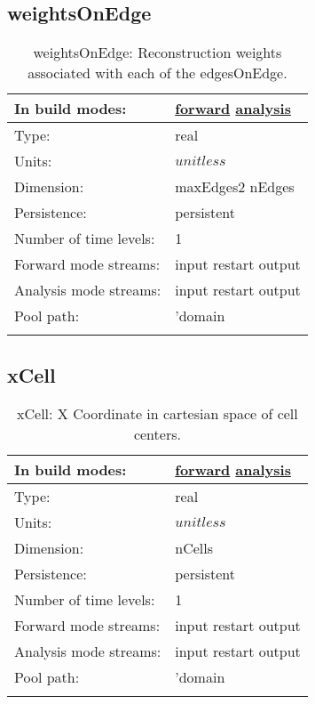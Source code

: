 \subsection[weightsOnEdge]{weightsOnEdge}
\label{subsec:var_sec_mesh_weightsOnEdge}
\begin{center}
\begin{longtable}{| p{2.0in} | p{4.0in} |}
        \hline 
        In build modes: & \hyperref[subsec:forward_var_tab_mesh]{forward} \hyperref[subsec:analysis_var_tab_mesh]{analysis} \\
        \hline 
        Type: & real \\
        \hline 
        Units: & $unitless$ \\
        \hline 
        Dimension: & maxEdges2 nEdges \\
        \hline 
        Persistence: & persistent \\
        \hline 
        Number of time levels: & 1 \\
        \hline 
		 Forward mode streams: &  input restart output \\
        \hline 
		 Analysis mode streams: &  input restart output \\
        \hline 
            Pool path: & 'domain %
 \\
		 \hline 
    \caption{weightsOnEdge: Reconstruction weights associated with each of the edgesOnEdge.}
\end{longtable}
\end{center}
\subsection[xCell]{xCell}
\label{subsec:var_sec_mesh_xCell}
\begin{center}
\begin{longtable}{| p{2.0in} | p{4.0in} |}
        \hline 
        In build modes: & \hyperref[subsec:forward_var_tab_mesh]{forward} \hyperref[subsec:analysis_var_tab_mesh]{analysis} \\
        \hline 
        Type: & real \\
        \hline 
        Units: & $unitless$ \\
        \hline 
        Dimension: & nCells \\
        \hline 
        Persistence: & persistent \\
        \hline 
        Number of time levels: & 1 \\
        \hline 
		 Forward mode streams: &  input restart output \\
        \hline 
		 Analysis mode streams: &  input restart output \\
        \hline 
            Pool path: & 'domain %
 \\
		 \hline 
    \caption{xCell: X Coordinate in cartesian space of cell centers.}
\end{longtable}
\end{center}
